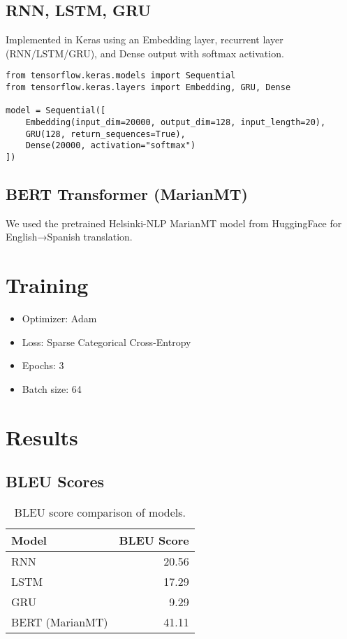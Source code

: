 \documentclass[12pt,a4paper]{article}
\begin{document}
\subsection{RNN, LSTM, GRU}
Implemented in Keras using an Embedding layer, recurrent layer (RNN/LSTM/GRU), and Dense output with softmax activation.

\begin{lstlisting}
from tensorflow.keras.models import Sequential
from tensorflow.keras.layers import Embedding, GRU, Dense

model = Sequential([
    Embedding(input_dim=20000, output_dim=128, input_length=20),
    GRU(128, return_sequences=True),
    Dense(20000, activation="softmax")
])
\end{lstlisting}

\subsection{BERT Transformer (MarianMT)}
We used the pretrained Helsinki-NLP MarianMT model from HuggingFace for English→Spanish translation.

\section{Training}
\begin{itemize}
    \item Optimizer: Adam
    \item Loss: Sparse Categorical Cross-Entropy
    \item Epochs: 3
    \item Batch size: 64
\end{itemize}

\section{Results}
\subsection{BLEU Scores}
\begin{table}[h]
\centering
\begin{tabular}{lr}
\toprule
Model & BLEU Score \\ \midrule
RNN & 20.56 \\
LSTM & 17.29 \\
GRU & 9.29 \\
BERT (MarianMT) & 41.11 \\
\bottomrule
\end{tabular}
\caption{BLEU score comparison of models.}
\end{table}
\end{document}
